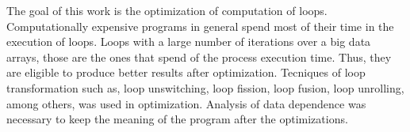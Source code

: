 \begin{Abstract}
        The goal of this work is the optimization of computation of loops.
        Computationally expensive programs in general spend most of their time
        in the execution of loops.
        Loops with a large number of iterations over a big data arrays, those are
        the ones that spend of the process execution time.
        Thus, they are eligible to produce better results after optimization.
        Tecniques of loop transformation such as, loop unswitching, loop fission,
        loop fusion, loop unrolling, among others, was used in optimization.
        Analysis of data dependence was necessary to keep the meaning of the 
        program after the optimizations.
\end{Abstract}

